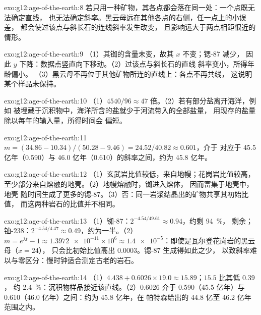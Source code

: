 \begin{solution}{exo:g12:age-of-the-earth:8}
若只用一种矿物，其各点都会落在同一处：一个点既无法确定直线，
也无法确定斜率。黑云母远在其他各点的右侧，任一点上的小误差，
都会使过该点与斜长石的连线斜率发生改变，
且影响远大于两点相距很近的情形。
\end{solution}

\begin{solution}{exo:g12:age-of-the-earth:9}
（1）其铷的含量未变，故其 $x$ 不变；锶-87 减少，
因此 $y$ 下降：数据点竖直向下移动。（2）过该点与斜长石的直线
斜率变小，所得年龄偏小。
（3）黑云母不再位于其他矿物所连的直线上：各点不再共线，
这说明某个样品未保持。
\end{solution}

\begin{solution}{exo:g12:age-of-the-earth:10}
（1）$4540/96 \approx 47$ 倍。（2）若有部分盐离开海洋，例如
被埋藏于沉积物中，海洋所含的盐就少于河流带入的全部盐量，
用现存的盐量除以每年的输入量，所得时间会
偏短。
\end{solution}

\begin{solution}{exo:g12:age-of-the-earth:11}
$m = (34.86 - 10.34)/(50.28 - 9.46) = 24.52/40.82 \approx 0.601$，介于
对应于 45.5 亿年（0.590）与 46.0 亿年（0.610）的斜率之间，约为 45.8
亿年。
\end{solution}

\begin{solution}{exo:g12:age-of-the-earth:12}
（1）玄武岩比值较低，来自地幔；花岗岩比值较高，
至少部分来自熔融的地壳。（2）地幔熔融时，铷进入熔体，
因而富集于地壳中，地壳
随时间生成了更多的锶-87。（3）否：同一岩浆结晶出的矿物共享其初始比值，
而这两种岩石的比值并不相同。
\end{solution}

\begin{solution}{exo:g12:age-of-the-earth:13}
（1）铷-87：$2^{-4.54/49.61} \approx 0.94$，约剩 \qty{94}{\percent}，
剩余；铀-238：$2^{-4.54/4.47} \approx 0.49$，约为一半。（2）$m =
e^{\lambda t} - 1 \approx \num{1.3972e-11} \times 10^6 \approx
\num{1.4e-5}$：即使是瓦尔登花岗岩的黑云母（$x = 24$），
只会比初始比值高出 $0.0003$。锶-87 生成得如此之少，
以致斜率难以与零区分：慢时钟适合测定古老的岩石。
\end{solution}

\begin{solution}{exo:g12:age-of-the-earth:14}
（1）$4.438 + 0.6026 \times 19.0 \approx 15.89$；$15.5$ 比其低 $0.39$，
约 \qty{2.4}{\percent}：沉积物样品接近该直线。（2）0.6026
介于 0.590（45.5 亿年）与 0.610（46.0 亿年）之间：约为 45.8 亿年，在
帕特森给出的 44.8 亿至 46.2 亿年范围之内。
\end{solution}

